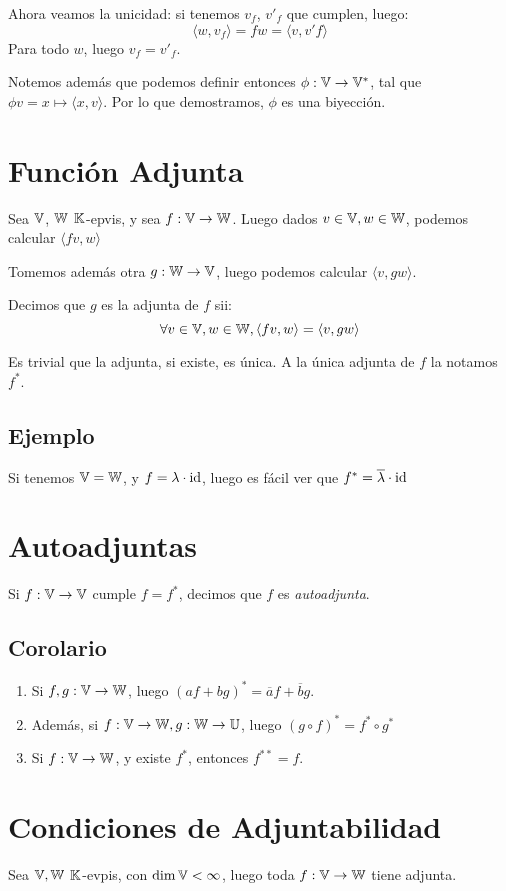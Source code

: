 \documentclass{article}
\begin{document}
Ahora veamos la unicidad: si tenemos $v_f$, $v'_f$ que cumplen, luego:
\[
    \langle w, v_f \rangle = fw = \langle v, v'f \rangle
\]
Para todo $w$, luego $v_f = v'_f$.

Notemos además que podemos definir entonces $\phi : \mathbb{V} \to \mathbb{V}^*$, tal que $\phi v = x \mapsto \langle x, v \rangle$. Por lo que demostramos, $\phi$ es una biyección.

\section*{Función Adjunta}
Sea $\mathbb{V}$, $\mathbb{W}$ $\mathbb{K}$-epvis, y sea $f : \mathbb{V} \to \mathbb{W}$. Luego dados $v \in \mathbb{V}, w \in \mathbb{W}$, podemos calcular $\langle fv, w \rangle$

Tomemos además otra $g : \mathbb{W} \to \mathbb{V}$, luego podemos calcular $\langle v, gw \rangle$.

Decimos que $g$ es la adjunta de $f$ sii:
\[
    \forall v \in \mathbb{V}, w \in \mathbb{W}, \langle fv, w \rangle = \langle v, gw \rangle
\]

Es trivial que la adjunta, si existe, es única. A la única adjunta de $f$ la notamos $f^*$.

\subsection*{Ejemplo}
Si tenemos $\mathbb{V} = \mathbb{W}$, y $f = \lambda \cdot \operatorname{id}$, luego es fácil ver que $f^* = \overline{\lambda} \cdot \operatorname{id}$

\section*{Autoadjuntas}
Si $f : \mathbb{V} \to \mathbb{V}$ cumple $f = f^*$, decimos que $f$ es \emph{autoadjunta}.

\subsection*{Corolario}
\begin{enumerate}
    \item Si $f, g : \mathbb{V} \to \mathbb{W}$, luego $(af+bg)^* = \overline af + \overline b g$.
    \item Además, si $f : \mathbb{V} \to \mathbb{W}, g : \mathbb{W} \to \mathbb{U}$, luego $(g \circ f)^* = f^* \circ g^*$
    \item Si $f : \mathbb{V} \to \mathbb{W}$, y existe $f^*$, entonces $f^{**} = f$.
\end{enumerate}

\section*{Condiciones de Adjuntabilidad}
Sea $\mathbb{V}, \mathbb{W}$ $\mathbb{K}$-evpis, con $\dim \mathbb{V} < \infty$, luego toda $f : \mathbb{V} \to \mathbb{W}$ tiene adjunta.
\end{document}
